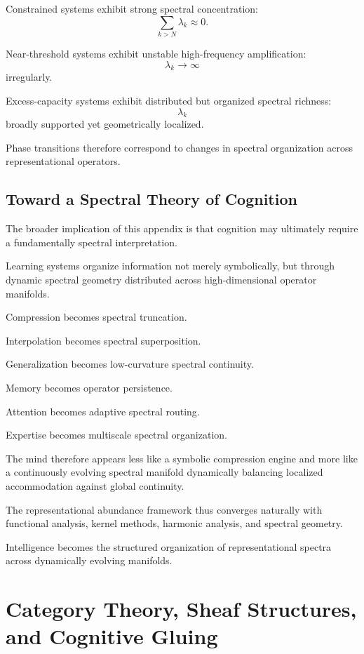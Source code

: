 \documentclass[12pt,a4paper]{article}
\begin{document}
Constrained systems exhibit strong spectral concentration:
\[
\sum_{k>N}
\lambda_k
\approx
0.
\]

Near-threshold systems exhibit unstable high-frequency amplification:
\[
\lambda_k
\rightarrow
\infty
\]
irregularly.

Excess-capacity systems exhibit distributed but organized spectral richness:
\[
\lambda_k
\]
broadly supported yet geometrically localized.

Phase transitions therefore correspond to changes in spectral organization across representational operators.

\subsection{Toward a Spectral Theory of Cognition}

The broader implication of this appendix is that cognition may ultimately require a fundamentally spectral interpretation.

Learning systems organize information not merely symbolically, but through dynamic spectral geometry distributed across high-dimensional operator manifolds.

Compression becomes spectral truncation.

Interpolation becomes spectral superposition.

Generalization becomes low-curvature spectral continuity.

Memory becomes operator persistence.

Attention becomes adaptive spectral routing.

Expertise becomes multiscale spectral organization.

The mind therefore appears less like a symbolic compression engine and more like a continuously evolving spectral manifold dynamically balancing localized accommodation against global continuity.

The representational abundance framework thus converges naturally with functional analysis, kernel methods, harmonic analysis, and spectral geometry.

Intelligence becomes the structured organization of representational spectra across dynamically evolving manifolds.


\section{Category Theory, Sheaf Structures, and Cognitive Gluing}
\end{document}
